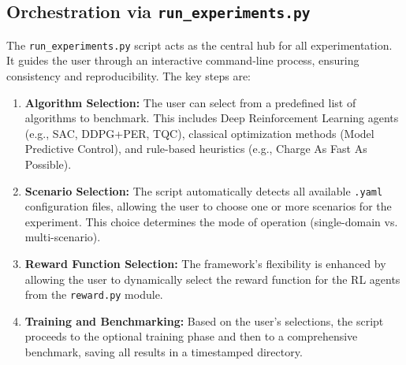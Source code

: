 \subsection{Orchestration via \texttt{run\_experiments.py}}
The \texttt{run\_experiments.py} script acts as the central hub for all experimentation. It guides the user through an interactive command-line process, ensuring consistency and reproducibility. The key steps are:
\begin{enumerate}
    \item \textbf{Algorithm Selection:} The user can select from a predefined list of algorithms to benchmark. This includes Deep Reinforcement Learning agents (e.g., SAC, DDPG+PER, TQC), classical optimization methods (Model Predictive Control), and rule-based heuristics (e.g., Charge As Fast As Possible).
    \item \textbf{Scenario Selection:} The script automatically detects all available \texttt{.yaml} configuration files, allowing the user to choose one or more scenarios for the experiment. This choice determines the mode of operation (single-domain vs. multi-scenario).
    \item \textbf{Reward Function Selection:} The framework's flexibility is enhanced by allowing the user to dynamically select the reward function for the RL agents from the \texttt{reward.py} module.
    \item \textbf{Training and Benchmarking:} Based on the user's selections, the script proceeds to the optional training phase and then to a comprehensive benchmark, saving all results in a timestamped directory.
\end{enumerate}

